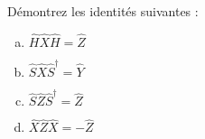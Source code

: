 Démontrez les identités suivantes :  \vspace{4pt}
\begin{multicols}{2}
    \begin{enumerate}[a)]
        \item $\hat{H}\hat{X}\hat{H} = \hat{Z}$
        \item $\hat{S}\hat{X}\hat{S}^\dagger = \hat{Y}$
        \item $\hat{S}\hat{Z}\hat{S}^\dagger = \hat{Z}$
        \item $\hat{X}\hat{Z}\hat{X} = -\hat{Z}$
    \end{enumerate}
\end{multicols}